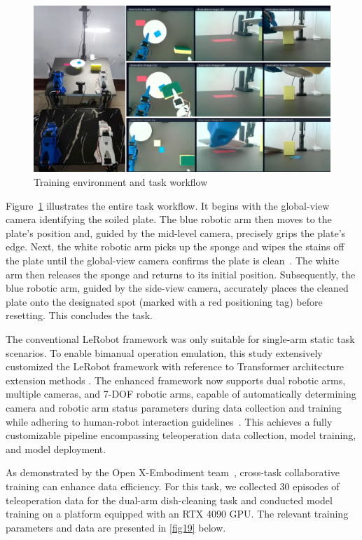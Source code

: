 \documentclass[runningheads]{llncs}
\begin{document}
\begin{figure}[H]
\centering
\includegraphics[width=\textwidth]{fig9.pdf}
\caption{ Training environment and task workflow} \label{fig9}
\end{figure}


Figure~\ref{fig9} illustrates the entire task workflow. It begins with the global-view camera identifying the soiled plate. The blue robotic arm then moves to the plate's position and, guided by the mid-level camera, precisely grips the plate's edge. Next, the white robotic arm picks up the sponge and wipes the stains off the plate until the global-view camera confirms the plate is clean~\cite{fu_deep_2022}. The white arm then releases the sponge and returns to its initial position. Subsequently, the blue robotic arm, guided by the side-view camera, accurately places the cleaned plate onto the designated spot (marked with a red positioning tag) before resetting. This concludes the task.


The conventional LeRobot framework was only suitable for single-arm static task scenarios. To enable bimanual operation emulation, this study extensively customized the LeRobot framework with reference to Transformer architecture extension methods . The enhanced framework now supports dual robotic arms, multiple cameras, and 7-DOF robotic arms, capable of automatically determining camera and robotic arm status parameters during data collection and training while adhering to human-robot interaction guidelines~\cite{ref15}. This achieves a fully customizable pipeline encompassing teleoperation data collection, model training, and model deployment.


As demonstrated by the Open X-Embodiment team~\cite{ref16}, cross-task collaborative training can enhance data efficiency. For this task, we collected 30 episodes of teleoperation data for the dual-arm dish-cleaning task and conducted model training on a platform equipped with an RTX 4090 GPU. The relevant training parameters and data are presented in \cref{fig19} below.
\end{document}
